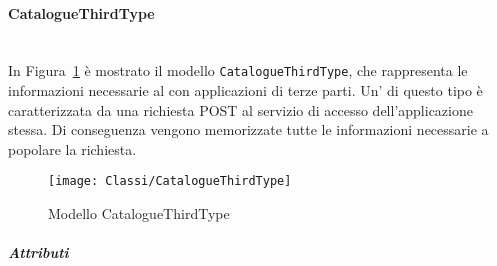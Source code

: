 \paragraph{CatalogueThirdType} \mbox{} \\
In Figura~\ref{fig:CatalogueThirdType} è mostrato il modello \texttt{CatalogueThirdType}, che rappresenta le informazioni necessarie al  con applicazioni di terze parti. Un' di questo tipo è caratterizzata da una richiesta POST al servizio di accesso dell'applicazione stessa. Di conseguenza vengono memorizzate tutte le informazioni necessarie a popolare la richiesta.

\begin{figure}[hbpc]
	\begin{center}
  		\texttt{[image: Classi/CatalogueThirdType]}
 		\caption[Modello CatalogueThirdType]{Modello CatalogueThirdType}
 		\label{fig:CatalogueThirdType}
 	\end{center} 
\end{figure}
\subparagraph{Attributi}
